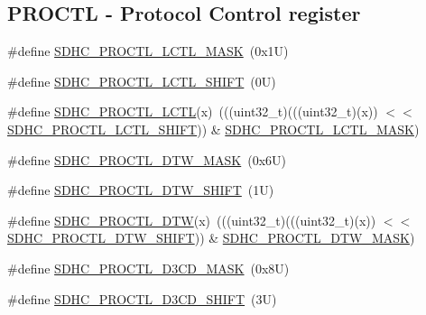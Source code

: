 \subsection*{P\+R\+O\+C\+TL -\/ Protocol Control register}
\begin{DoxyCompactItemize}
\item 
\#define \mbox{\hyperlink{group___s_d_h_c___register___masks_ga482b0e558b7376a5e14f47bffdcb33c1}{S\+D\+H\+C\+\_\+\+P\+R\+O\+C\+T\+L\+\_\+\+L\+C\+T\+L\+\_\+\+M\+A\+SK}}~(0x1\+U)
\item 
\#define \mbox{\hyperlink{group___s_d_h_c___register___masks_ga754a95dd49bc69dbc62ae443f1c12d16}{S\+D\+H\+C\+\_\+\+P\+R\+O\+C\+T\+L\+\_\+\+L\+C\+T\+L\+\_\+\+S\+H\+I\+FT}}~(0\+U)
\item 
\#define \mbox{\hyperlink{group___s_d_h_c___register___masks_ga2c4ff3610dabce2cf73241af4bb3b2c4}{S\+D\+H\+C\+\_\+\+P\+R\+O\+C\+T\+L\+\_\+\+L\+C\+TL}}(x)~(((uint32\+\_\+t)(((uint32\+\_\+t)(x)) $<$$<$ \mbox{\hyperlink{group___s_d_h_c___register___masks_ga754a95dd49bc69dbc62ae443f1c12d16}{S\+D\+H\+C\+\_\+\+P\+R\+O\+C\+T\+L\+\_\+\+L\+C\+T\+L\+\_\+\+S\+H\+I\+FT}})) \& \mbox{\hyperlink{group___s_d_h_c___register___masks_ga482b0e558b7376a5e14f47bffdcb33c1}{S\+D\+H\+C\+\_\+\+P\+R\+O\+C\+T\+L\+\_\+\+L\+C\+T\+L\+\_\+\+M\+A\+SK}})
\item 
\#define \mbox{\hyperlink{group___s_d_h_c___register___masks_gabd8aa52532f5ddcfe86bbd56dd467aaa}{S\+D\+H\+C\+\_\+\+P\+R\+O\+C\+T\+L\+\_\+\+D\+T\+W\+\_\+\+M\+A\+SK}}~(0x6\+U)
\item 
\#define \mbox{\hyperlink{group___s_d_h_c___register___masks_ga7738f58de3f0c8a3c55fdf494fa9b7a5}{S\+D\+H\+C\+\_\+\+P\+R\+O\+C\+T\+L\+\_\+\+D\+T\+W\+\_\+\+S\+H\+I\+FT}}~(1\+U)
\item 
\#define \mbox{\hyperlink{group___s_d_h_c___register___masks_gae2aac9ca891c75cdd5355a7cc7b012e8}{S\+D\+H\+C\+\_\+\+P\+R\+O\+C\+T\+L\+\_\+\+D\+TW}}(x)~(((uint32\+\_\+t)(((uint32\+\_\+t)(x)) $<$$<$ \mbox{\hyperlink{group___s_d_h_c___register___masks_ga7738f58de3f0c8a3c55fdf494fa9b7a5}{S\+D\+H\+C\+\_\+\+P\+R\+O\+C\+T\+L\+\_\+\+D\+T\+W\+\_\+\+S\+H\+I\+FT}})) \& \mbox{\hyperlink{group___s_d_h_c___register___masks_gabd8aa52532f5ddcfe86bbd56dd467aaa}{S\+D\+H\+C\+\_\+\+P\+R\+O\+C\+T\+L\+\_\+\+D\+T\+W\+\_\+\+M\+A\+SK}})
\item 
\#define \mbox{\hyperlink{group___s_d_h_c___register___masks_ga597b9ab57f2ad515508d8b2e8b3832c7}{S\+D\+H\+C\+\_\+\+P\+R\+O\+C\+T\+L\+\_\+\+D3\+C\+D\+\_\+\+M\+A\+SK}}~(0x8\+U)
\item 
\#define \mbox{\hyperlink{group___s_d_h_c___register___masks_ga9bd9fc5a38a643e4a04f03026a18e55a}{S\+D\+H\+C\+\_\+\+P\+R\+O\+C\+T\+L\+\_\+\+D3\+C\+D\+\_\+\+S\+H\+I\+FT}}~(3\+U)

\end{DoxyCompactItemize}
